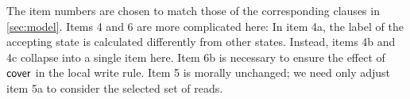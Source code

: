 \begin{definition}
\begin{enumerate}
\end{enumerate}
\end{definition}


The item numbers are chosen to match those of the corresponding clauses in
\textsection\ref{sec:model}.  Items 4 and 6 are more complicated here:
In item 4a, the label of the accepting state is calculated differently from
other states. Instead, items 4b and 4c collapse into a single item here.
Item 6b is necessary to ensure the effect of $\relfilt{}$ in the local write
rule.  Item 5 is morally unchanged; we need only adjust item 5a to consider
the selected set of reads.

